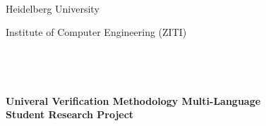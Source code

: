 


%


\thispagestyle{empty}




\begin{verbatim}


\end{verbatim}

\begin{center}
\Large{Heidelberg University}\\
\end{center}


\begin{center}
\Large{Institute of Computer Engineering (ZITI)}
\end{center}
\begin{verbatim}




\end{verbatim}
\begin{center}
\doublespacing
\textbf{\LARGE{Univeral Verification Methodology Multi-Language}}\\
\medskip
\textbf{\large{Student Research Project}}\\
\singlespacing
\begin{verbatim}

\end{verbatim}
\end{center}
\begin{verbatim}

\end{verbatim}
\begin{center}

\end{center}

